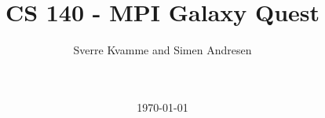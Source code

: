 \newcommand{\figurepath}{./figures/}
\newcommand{\figurescale}{0.6}
\newcommand{\codepath}{../matlab/}




\title{ CS 140 - MPI Galaxy Quest}
\author{Sverre Kvamme and Simen Andresen}
\date{\ \\ \ \\ \today}




\maketitle


\pagestyle{fancy}
\lhead{}
\rhead{\thepage}
\setcounter{page}{1}

\rhead{\thepage}
\cfoot{}


%



